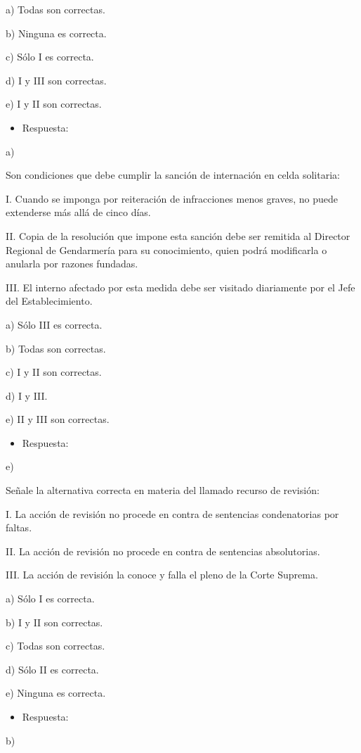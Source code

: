 \documentclass[letterpaper, 11pt]{article}
\begin{document}
a) Todas son correctas.

b) Ninguna es correcta.

c) Sólo I es correcta.

d) I y III son correctas.

e) I y II son correctas.

\begin{itemize}
\item Respuesta:
\end{itemize}
a)

Son condiciones que debe cumplir la sanción de internación en celda solitaria:

I. Cuando se imponga por reiteración de infracciones menos graves, no puede
extenderse más allá de cinco días.

II. Copia de la resolución que impone esta sanción debe ser remitida al Director
Regional de Gendarmería para su conocimiento, quien podrá modificarla o anularla
por razones fundadas.

III. El interno afectado por esta medida debe ser visitado diariamente por el Jefe del
Establecimiento.

a) Sólo III es correcta.

b) Todas son correctas.

c) I y II son correctas.

d) I y III.

e) II y III son correctas.

\begin{itemize}
\item Respuesta:
\end{itemize}
e)


Señale la alternativa correcta en materia del llamado recurso de revisión:

I. La acción de revisión no procede en contra de sentencias condenatorias por faltas.

II. La acción de revisión no procede en contra de sentencias absolutorias.

III. La acción de revisión la conoce y falla el pleno de la Corte Suprema.

a) Sólo I es correcta.

b) I y II son correctas.

c) Todas son correctas.

d) Sólo II es correcta.

e) Ninguna es correcta.

\begin{itemize}
\item Respuesta:
\end{itemize}
b)
\end{document}
